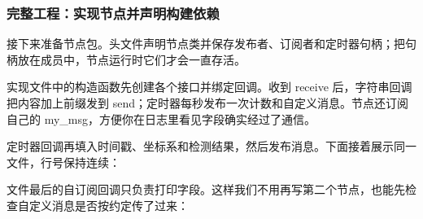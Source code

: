 \subsubsection{完整工程：实现节点并声明构建依赖}
\begin{example}
接下来准备节点包。头文件声明节点类并保存发布者、订阅者和定时器句柄；把句柄放在成员中，节点运行时它们才会一直存活。
\par\medskip\noindent\begin{minipage}{\linewidth}

\end{minipage}\par\smallskip

实现文件中的构造函数先创建各个接口并绑定回调。收到 receive 后，字符串回调把内容加上前缀发到 send；定时器每秒发布一次计数和自定义消息。节点还订阅自己的 my\_msg，方便你在日志里看见字段确实经过了通信。

定时器回调再填入时间戳、坐标系和检测结果，然后发布消息。下面接着展示同一文件，行号保持连续：
\par\medskip\noindent\begin{minipage}{\linewidth}

\end{minipage}\par\smallskip

文件最后的自订阅回调只负责打印字段。这样我们不用再写第二个节点，也能先检查自定义消息是否按约定传了过来：
\par\medskip\noindent\begin{minipage}{\linewidth}

\end{minipage}\par\smallskip



\end{example}
